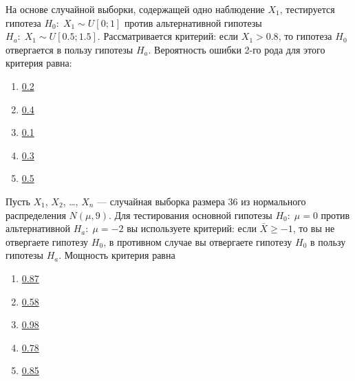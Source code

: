 \documentclass[t]{beamer}
\begin{document}
 \begin{frame} \label{13} 
\begin{block}{13} 

На основе случайной выборки, содержащей одно наблюдение  $X_1$, тестируется гипотеза $H_0: \; X_1 \sim U[0;1]$  против альтернативной гипотезы  $H_a: \; X_1 \sim U[0.5;1.5]$. Рассматривается критерий: если $X_1>0.8$, то гипотеза $H_0$  отвергается в пользу гипотезы  $H_a$. Вероятность ошибки 2-го рода для этого критерия равна:
 


 \end{block} 
\begin{enumerate} 
\item[] \hyperlink{13-No}{\beamergotobutton{} 0.2}
\item[] \hyperlink{13-No}{\beamergotobutton{} 0.4}
\item[] \hyperlink{13-No}{\beamergotobutton{} 0.1}
\item[] \hyperlink{13-Yes}{\beamergotobutton{} 0.3}
\item[] \hyperlink{13-No}{\beamergotobutton{} 0.5}
\end{enumerate} 
\end{frame} 


 \begin{frame} \label{14} 
\begin{block}{14} 

Пусть $X_1$, $X_2$, \ldots, $X_n$ — случайная выборка размера 36 из нормального распределения $N(\mu, 9)$. Для тестирования основной гипотезы  $H_0: \; \mu=0$  против альтернативной $H_a: \; \mu=-2$   вы используете критерий: если  $\bar{X}\geq -1$, то вы не отвергаете гипотезу $H_0$, в противном случае вы отвергаете гипотезу  $H_0$ в пользу гипотезы  $H_a$. Мощность критерия равна
 


 \end{block} 
\begin{enumerate} 
\item[] \hyperlink{14-No}{\beamergotobutton{} 0.87}
\item[] \hyperlink{14-No}{\beamergotobutton{} 0.58}
\item[] \hyperlink{14-Yes}{\beamergotobutton{} 0.98}
\item[] \hyperlink{14-No}{\beamergotobutton{} 0.78}
\item[] \hyperlink{14-No}{\beamergotobutton{} 0.85}
\end{enumerate} 
\end{frame} 
\end{document}
